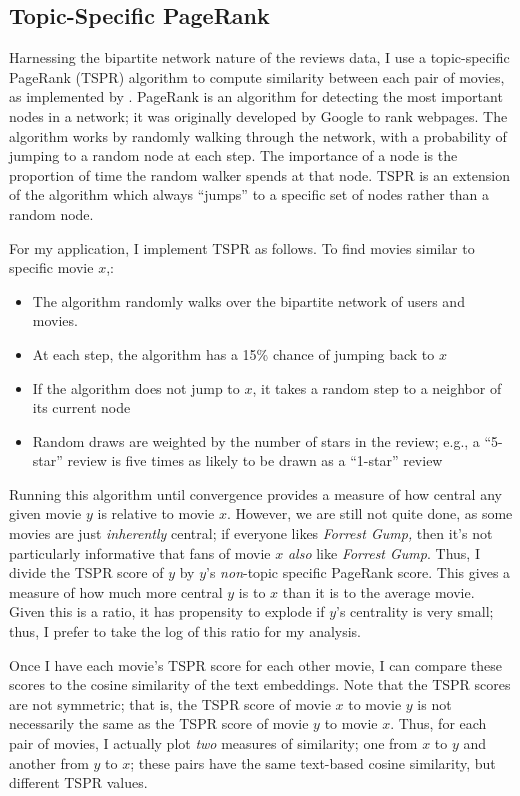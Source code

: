 \documentclass{article}
\begin{document}
\subsection{Topic-Specific PageRank}

Harnessing the bipartite network nature of the reviews data, I use a topic-specific PageRank (TSPR) algorithm to compute similarity between each pair of movies, as implemented by \textcite{sajani2023}. PageRank is an algorithm for detecting the most important nodes in a network; it was originally developed by Google to rank webpages. The algorithm works by randomly walking through the network, with a probability of jumping to a random node at each step. The importance of a node is the proportion of time the random walker spends at that node. TSPR is an extension of the algorithm which always ``jumps'' to a specific set of nodes rather than a random node.

For my application, I implement TSPR as follows. To find movies similar to specific movie $x$,:
\begin{itemize}
    \item The algorithm randomly walks over the bipartite network of users and movies. 
    \item At each step, the algorithm has a 15\% chance of jumping back to $x$
    \item If the algorithm does not jump to $x$, it takes a random step to a neighbor of its current node
    \item Random draws are weighted by the number of stars in the review; e.g., a ``5-star'' review is five times as likely to be drawn as a ``1-star'' review
\end{itemize}

Running this algorithm until convergence provides a measure of how central any given movie $y$ is relative to movie $x$. However, we are still not quite done, as some movies are just \emph{inherently} central; if everyone likes \emph{Forrest Gump,} then it's not particularly informative that fans of movie $x$ \emph{also} like \emph{Forrest Gump}. Thus, I divide the TSPR score of $y$ by $y$'s \emph{non}-topic specific PageRank score. This gives a measure of how much more central $y$ is to $x$ than it is to the average movie. Given this is a ratio, it has propensity to explode if $y$'s centrality is very small; thus, I prefer to take the log of this ratio for my analysis.

Once I have each movie's TSPR score for each other movie, I can compare these scores to the cosine similarity of the text embeddings. Note that the TSPR scores are not symmetric; that is, the TSPR score of movie $x$ to movie $y$ is not necessarily the same as the TSPR score of movie $y$ to movie $x$. Thus, for each pair of movies, I actually plot \emph{two} measures of similarity; one from $x$ to $y$ and another from $y$ to $x$; these pairs have the same text-based cosine similarity, but different TSPR values. 
\end{document}
